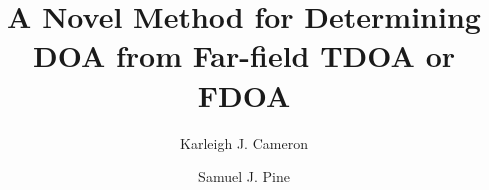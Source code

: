 \documentclass[12pt]{amsart}
\theoremstyle{definition}
\theoremstyle{remark}
\begin{document}
\title{A Novel Method for Determining DOA from Far-field TDOA or FDOA}
\author{Karleigh J. Cameron }
\author{Samuel J. Pine } %


%

\maketitle







%










\end{document}
